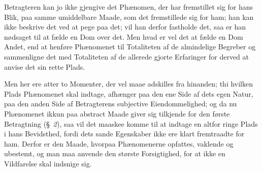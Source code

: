 \documentclass[12pt]{book}
\begin{document}
Betragteren kan jo ikke gjengive det Phænomen, der har fremstillet sig for hans
Blik, paa samme umiddelbare Maade, som det fremstillede sig for ham; han kan
ikke beskrive det ved at pege paa det; vil han derfor fastholde det, saa er han
nødsaget til at fælde en Dom over det. Men hvad er vel det at fælde en Dom
Andet, end at henføre Phænomenet til Totaliteten af de almindelige Begreber og
sammenligne det med Totaliteten af de allerede gjorte Erfaringer for derved at
anvise det sin rette Plads.

Men her ere atter to Momenter, der vel maae adskilles fra hinanden; thi hvilken
Plads Phænomenet skal indtage, afhænger paa den ene Side af dets egen Natur,
paa den anden Side af Betragterens subjective Eiendommelighed; og da nu
Phænomenet ikkun paa abstract Maade giver sig tilkjende for den første
Betragtning (§~\textit{2}), saa vil det maaskee komme til at indtage en altfor
ringe Plads i hans Bevidsthed, fordi dets sande Egenskaber ikke ere klart
fremtraadte for ham. Derfor er den Maade, hvorpaa Phænomenerne opfattes,
vaklende og ubestemt, og man maa anvende den største Forsigtighed, for at ikke
en Vildfarelse skal indsnige sig.
\end{document}
